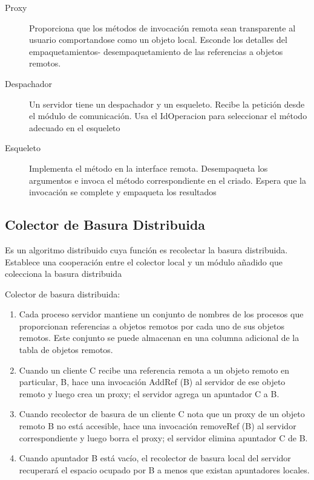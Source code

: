 \begin{description}
	\item[Proxy]
	Proporciona que los métodos de invocación remota sean                 transparente al usuario comportandose como un objeto local.
	Esconde los detalles del empaquetamientos- desempaquetamiento de las referencias a objetos remotos.
	
	\item[Despachador] 
	Un servidor tiene un despachador y un esqueleto.
	Recibe la petición desde el  módulo de comunicación.
	Usa el IdOperacion para seleccionar el método adecuado en el esqueleto
	
	\item[Esqueleto] 
	Implementa el método  en la interface remota. 
	Desempaqueta los argumentos e invoca el método      				correspondiente en el criado.
	Espera que la invocación se complete y empaqueta los resultados
\end{description}


\subsection{Colector de Basura Distribuida} 
Es un algoritmo distribuido cuya funci\'on es  recolectar la basura distribuida. Establece una cooperación entre el colector local y un módulo añadido que colecciona la basura distribuida

Colector de basura distribuida:
\begin{enumerate}
	\item  Cada proceso servidor mantiene un conjunto de nombres de los procesos que proporcionan referencias a objetos remotos por cada uno de sus objetos remotos. Este conjunto se puede almacenan en una columna adicional de la tabla de objetos remotos.
	\item Cuando un cliente C recibe una referencia remota a un objeto remoto en particular, B,  hace una invocación AddRef (B) al servidor de ese objeto remoto y luego crea un proxy; el servidor agrega un apuntador C a B.
	\item  Cuando  recolector de basura de un cliente C nota que un proxy de un objeto remoto B no está accesible, hace una invocación removeRef (B) al servidor correspondiente y luego borra el proxy; el servidor elimina apuntador C de B.
	\item Cuando apuntador B está vacío, el recolector de basura local del servidor recuperará el espacio ocupado por B a menos que existan apuntadores locales.
\end{enumerate}

